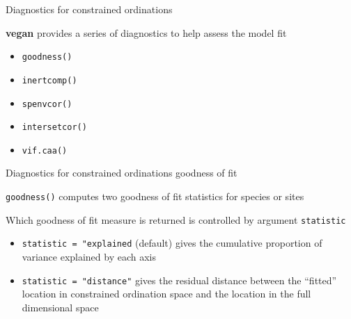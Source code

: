 \documentclass[10pt,ignorenonframetext,compress, aspectratio=169]{beamer}
\begin{document}
\begin{frame}{Diagnostics for constrained ordinations}

\textbf{vegan} provides a series of diagnostics to help assess the model
fit

\begin{itemize}
\itemsep1pt\parskip0pt
\item
  \texttt{goodness()}
\item
  \texttt{inertcomp()}
\item
  \texttt{spenvcor()}
\item
  \texttt{intersetcor()}
\item
  \texttt{vif.caa()}
\end{itemize}

\end{frame}

\begin{frame}{Diagnostics for constrained ordinations \textbar{}
goodness of fit}

\texttt{goodness()} computes two goodness of fit statistics for species
or sites

Which goodness of fit measure is returned is controlled by argument
\texttt{statistic}

\begin{itemize}
\itemsep1pt\parskip0pt
\item
  \texttt{statistic\ =\ "explained} (default) gives the cumulative
  proportion of variance explained by each axis
\item
  \texttt{statistic\ =\ "distance"} gives the residual distance between
  the ``fitted'' location in constrained ordination space and the
  location in the full dimensional space
\end{itemize}

\end{frame}
\end{document}
